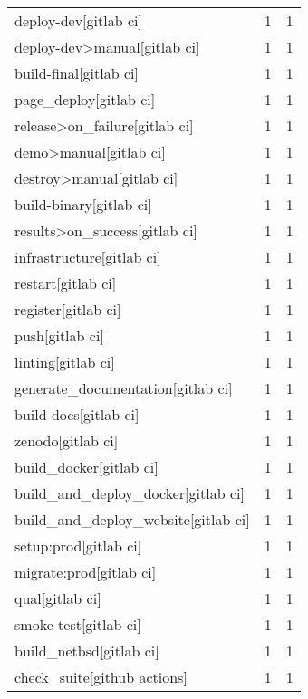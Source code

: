\begin{tabular}{lrr}
deploy-dev[gitlab ci]                      &                   1 &             1 \\
deploy-dev>manual[gitlab ci]               &                   1 &             1 \\
build-final[gitlab ci]                     &                   1 &             1 \\
page\_deploy[gitlab ci]                     &                   1 &             1 \\
release>on\_failure[gitlab ci]              &                   1 &             1 \\
demo>manual[gitlab ci]                     &                   1 &             1 \\
destroy>manual[gitlab ci]                  &                   1 &             1 \\
build-binary[gitlab ci]                    &                   1 &             1 \\
results>on\_success[gitlab ci]              &                   1 &             1 \\
infrastructure[gitlab ci]                  &                   1 &             1 \\
restart[gitlab ci]                         &                   1 &             1 \\
register[gitlab ci]                        &                   1 &             1 \\
push[gitlab ci]                            &                   1 &             1 \\
linting[gitlab ci]                         &                   1 &             1 \\
generate\_documentation[gitlab ci]          &                   1 &             1 \\
build-docs[gitlab ci]                      &                   1 &             1 \\
zenodo[gitlab ci]                          &                   1 &             1 \\
build\_docker[gitlab ci]                    &                   1 &             1 \\
build\_and\_deploy\_docker[gitlab ci]         &                   1 &             1 \\
build\_and\_deploy\_website[gitlab ci]        &                   1 &             1 \\
setup:prod[gitlab ci]                      &                   1 &             1 \\
migrate:prod[gitlab ci]                    &                   1 &             1 \\
qual[gitlab ci]                            &                   1 &             1 \\
smoke-test[gitlab ci]                      &                   1 &             1 \\
build\_netbsd[gitlab ci]                    &                   1 &             1 \\
check\_suite[github actions]                &                   1 &             1 \\
\bottomrule
\end{tabular}
